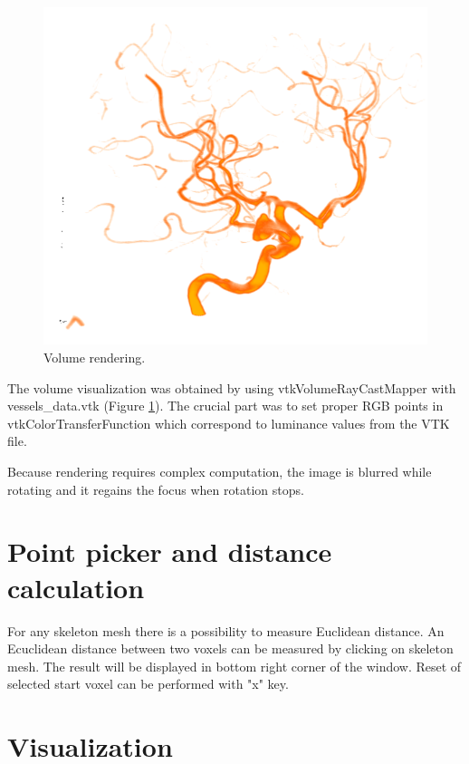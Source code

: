 \begin{figure}
	\centering
	\includegraphics[scale=0.4]{fig/volume-rendering}
	\caption{Volume rendering.}
	\label{fig:volume-rendering}
\end{figure}

The volume visualization was obtained by using vtkVolumeRayCastMapper with vessels\_data.vtk (Figure \ref{fig:volume-rendering}). The crucial part was to set proper RGB points in vtkColorTransferFunction which correspond to luminance values from the VTK file.

Because rendering requires complex computation, the image is blurred while rotating and it regains the focus when rotation stops.

\section{Point picker and distance calculation}

For any skeleton mesh there is a possibility to measure Euclidean distance. An Ecuclidean distance between two voxels can be measured by clicking on skeleton mesh. The result will be displayed in bottom right corner of the window. Reset of selected start voxel can be performed with "x" key.

\section{Visualization}


